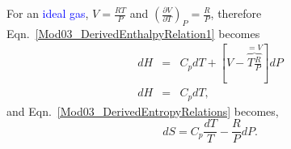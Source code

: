 \documentclass[12pts,a4paper,amsmath,amssymb,floatfix]{article}%
\newcommand{\frc}{\displaystyle\frac}
\newcommand{\blue}{\textcolor{blue}}
\newcommand{\Partial}[3][error]{\left(\frc{\partial #1}{\partial #2}\right)_{#3}}
\begin{document}
\begin{shaded}
      \noindent
      For an \blue{ideal gas}, $V=\frac{RT}{P}$ and $\Partial[V]{T}{P} = \frc{R}{P}$, therefore Eqn.~\ref{Mod03_DerivedEnthalpyRelation1} becomes
         \begin{eqnarray}
            dH &=& C_{p}dT + \left[V-\overbrace{T\frc{R}{P}}^{=V}\right]dP \nonumber \\
            dH &=& C_{p}dT,\label{Mod03_DerivedEnthalpyRelation2}
         \end{eqnarray}
      and Eqn.~\ref{Mod03_DerivedEntropyRelations} becomes,
         \begin{equation}
            dS = C_{p}\frc{dT}{T} -\frc{R}{P}dP.\label{Mod03_DerivedEntropyRelations2}
         \end{equation}
\end{shaded}

\bigskip
\end{document}
